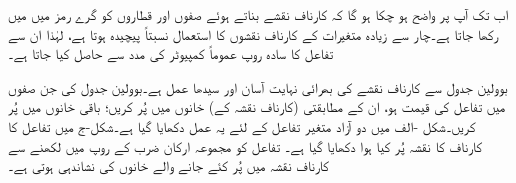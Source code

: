 اب تک آپ پر واضح ہو چکا ہو گا کہ کارناف نقشے   بناتے  ہوئے صفوں اور قطاروں کو گرے  رمز میں  میں رکھا جاتا ہے۔چار سے زیادہ متغیرات کے کارناف نقشوں  کا استعمال نسبتاً پیچیدہ  ہوتا ہے،   لہٰذا  ان  سے   تفاعل کا سادہ روپ  عموماً کمپیوٹر کی مدد سے حاصل کیا جاتا ہے۔ 


 بوولین جدول سے کارناف  نقشے کی بھرائی  نہایت آسان اور سیدھا عمل ہے۔بوولین جدول کی جن صفوں میں تفاعل کی قیمت  ہو،  ان کے مطابقتی (کارناف  نقشہ کے)    خانوں  میں  پُر کریں؛  باقی خانوں میں  پُر کریں۔شکل -الف  میں دو آزاد متغیر تفاعل   کے لئے  یہ عمل دکھایا گیا ہے۔شکل-ج میں  تفاعل کا کارناف کا نقشہ پُر کیا ہوا دکھایا گیا ہے۔ تفاعل کو مجموعہ ارکان ضرب کے روپ  میں لکھنے سے کارناف نقشہ  میں  پُر کئے جانے والے خانوں کی نشاندہی ہوتی ہے۔
 
